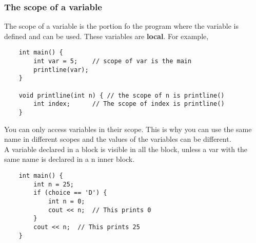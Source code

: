 \documentclass[]{article}
\begin{document}
\subsubsection{The scope of a variable}
\bigbreak


The scope of a variable is the portion fo the program where the variable is defined and can be used. These variables are \textbf{local}. For example, 

\begin{lstlisting}
	int main() {
		int var = 5;	// scope of var is the main	
		printline(var);
	}
	
	void printline(int n) {	// the scope of n is printline()
		int index;		// The scope of index is printline()	
	}
\end{lstlisting}\bigbreak

You can only access variables in their scope. This is why you can use the same name in different scopes and the values of the variables can be different.\\

A variable declared in a block {} is visible in all the block, unless a var with the same name is declared in a n inner block.\\

\begin{lstlisting}
	int main() {
		int n = 25;
		if (choice == 'D') {
			int n = 0;
			cout << n;	// This prints 0
		}
		cout << n;	// This prints 25
	}
\end{lstlisting}\bigbreak
\end{document}

